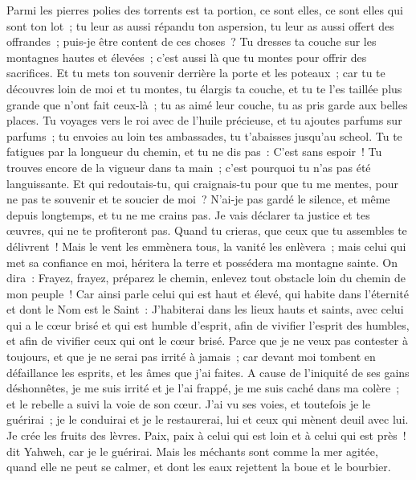 \begin{multicols}{2}
Parmi les pierres polies des torrents est ta portion, ce sont elles, ce sont elles qui sont ton lot~; tu leur as aussi répandu ton aspersion, tu leur as aussi offert des offrandes~; puis-je être content de ces choses~?
Tu dresses ta couche sur les montagnes hautes et élevées~; c'est aussi là que tu montes pour offrir des sacrifices.
Et tu mets ton souvenir derrière la porte et les poteaux~; car tu te découvres loin de moi et tu montes, tu élargis ta couche, et tu te l'es taillée plus grande que n'ont fait ceux-là~; tu as aimé leur couche, tu as pris garde aux belles places.
Tu voyages vers le roi avec de l'huile précieuse, et tu ajoutes parfums sur parfums~; tu envoies au loin tes ambassades, tu t'abaisses jusqu'au scheol.
Tu te fatigues par la longueur du chemin, et tu ne dis pas~: C'est sans espoir~! Tu trouves encore de la vigueur dans ta main~; c'est pourquoi tu n'as pas été languissante.
Et qui redoutais-tu, qui craignais-tu pour que tu me mentes, pour ne pas te souvenir et te soucier de moi~? N'ai-je pas gardé le silence, et même depuis longtemps, et tu ne me crains pas.
Je vais déclarer ta justice et tes œuvres, qui ne te profiteront pas.
Quand tu crieras, que ceux que tu assembles te délivrent~! Mais le vent les emmènera tous, la vanité les enlèvera~; mais celui qui met sa confiance en moi, héritera la terre et possédera ma montagne sainte.
On dira~: Frayez, frayez, préparez le chemin, enlevez tout obstacle loin du chemin de mon peuple~!
Car ainsi parle celui qui est haut et élevé, qui habite dans l'éternité et dont le Nom est le Saint~: J'habiterai dans les lieux hauts et saints, avec celui qui a le cœur brisé et qui est humble d'esprit, afin de vivifier l'esprit des humbles, et afin de vivifier ceux qui ont le cœur brisé.
Parce que je ne veux pas contester à toujours, et que je ne serai pas irrité à jamais~; car devant moi tombent en défaillance les esprits, et les âmes que j'ai faites.
A cause de l'iniquité de ses gains déshonnêtes, je me suis irrité et je l'ai frappé, je me suis caché dans ma colère~; et le rebelle a suivi la voie de son cœur.
J'ai vu ses voies, et toutefois je le guérirai~; je le conduirai et je le restaurerai, lui et ceux qui mènent deuil avec lui.
Je crée les fruits des lèvres. Paix, paix à celui qui est loin et à celui qui est près~! dit Yahweh, car je le guérirai.
Mais les méchants sont comme la mer agitée, quand elle ne peut se calmer, et dont les eaux rejettent la boue et le bourbier.

\end{multicols}
